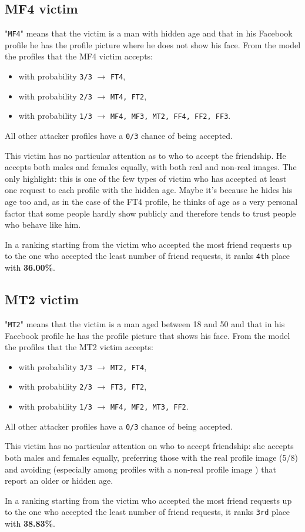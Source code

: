\subsection*{MF4 victim}
"\texttt{MF4}" means that the victim is a man with hidden age and that in his Facebook profile he has the profile picture where he does not show his face.
From the model the profiles that the MF4 victim accepts:
\begin{itemize}
	\item with probability \texttt{3/3} $\rightarrow$ \texttt{FT4},	
	\item with probability \texttt{2/3} $\rightarrow$ \texttt{MT4, FT2},
	\item with probability \texttt{1/3} $\rightarrow$ \texttt{MF4, MF3, MT2, FF4, FF2, FF3}.
\end{itemize}  
All other attacker profiles have a \texttt{0/3} chance of being accepted. \par \noindent
This victim has no particular attention as to who to accept the friendship. He accepts both males and females equally, with both real and non-real images. The only highlight: this is one of the few types of victim who has accepted at least one request to each profile with the hidden age. Maybe it's because he hides his age too and, as in the case of the FT4 profile, he thinks of age as a very personal factor that some people hardly show publicly and therefore tends to trust people who behave like him.
\par \noindent In a ranking starting from the victim who accepted the most friend requests up to the one who accepted the least number of friend requests, it ranks \texttt{4th} place with \textbf{36.00\%}.


\subsection*{MT2 victim}
"\texttt{MT2}" means that the victim is a man aged between 18 and 50 and that in his Facebook profile he has the profile picture that shows his face.
From the model the profiles that the MT2 victim accepts:
\begin{itemize}
	\item with probability \texttt{3/3} $\rightarrow$ \texttt{MT2, FT4},	
	\item with probability \texttt{2/3} $\rightarrow$ \texttt{FT3, FT2},
	\item with probability \texttt{1/3} $\rightarrow$ \texttt{MF4, MF2, MT3, FF2}.
\end{itemize} 
All other attacker profiles have a \texttt{0/3} chance of being accepted. \par \noindent
This victim has no particular attention on who to accept friendship: she accepts both males and females equally, preferring those with the real profile image (5/8) and avoiding (especially among profiles with a non-real profile image ) that report an older or hidden age.
\par \noindent In a ranking starting from the victim who accepted the most friend requests up to the one who accepted the least number of friend requests, it ranks \texttt{3rd} place with \textbf{38.83\%}.


